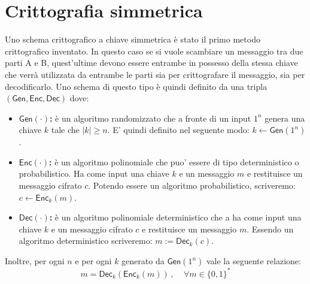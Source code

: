 \section{Crittografia simmetrica}
Uno schema crittografico a chiave simmetrica è stato il primo metodo crittografico inventato.
In questo caso se si vuole scambiare un messaggio tra due parti A e B, quest'ultime devono essere entrambe in possesso della stessa chiave che verrà utilizzata da entrambe le parti sia per crittografare il messaggio, sia per decodificarlo.
Uno schema di questo tipo è quindi definito da una tripla $(\mathsf{Gen},\mathsf{Enc},\mathsf{Dec})$ dove:
\begin{itemize}
    \item{\textbf{$\mathsf{Gen}(\cdot)$:} è un algoritmo randomizzato che a fronte di un input $1^{n}$ genera una chiave $k$ tale che $|k| \geq n$. E' quindi definito nel seguente modo: $k \leftarrow \mathsf{Gen}(1^{n})$}.
    \item{\textbf{$\mathsf{Enc}(\cdot)$:} è un algoritmo polinomiale che puo' essere di tipo deterministico o probabilistico. Ha come input una chiave $k$ e un messaggio $m$ e restituisce un messaggio cifrato $c$. Potendo essere un algoritmo probabilistico, scriveremo: $c \leftarrow \mathsf{Enc}_k(m)$.}
    \item{\textbf{$\mathsf{Dec}(\cdot)$:} è un algoritmo polinomiale deterministico che a ha come input una chiave $k$ e un messaggio cifrato $c$ e restituisce un messaggio $m$. Essendo un algoritmo deterministico scriveremo: $m := \mathsf{Dec}_k(c)$.}
\end{itemize}
Inoltre, per ogni $n$ e per ogni $k$ generato da $\mathsf{Gen}(1^{n})$ vale la seguente relazione:
$$
    m = \mathsf{Dec}_k(\mathsf{Enc}_k(m))\,,\;\;\;\;\forall m \in \{0, 1\}^{*}
$$


